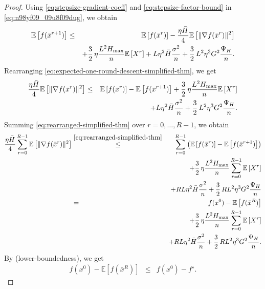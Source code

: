 \documentclass{article}
\newcommand{\Exp}[1]{{\mathbb{E}} \left[ #1 \right]}
\theoremstyle{plain}
\theoremstyle{definition}
\begin{document}
\begin{proof}
    Using \eqref{eq:stepsize-gradient-coeff} and \eqref{eq:stepsize-factor-bound} in
    \eqref{eq:n98yf09_09u8f09dug}, we obtain
    \begin{eqnarray}
    \Exp{f(\bar x^{r+1})}
    &\leq&
    \Exp{f(\bar x^r)}
    -
    \frac{\eta\bar H}{4}
    \Exp{\|\nabla f(\bar x^r)\|^2}
    \notag\\
    &&+
    \frac{3}{2}\,\eta\frac{L^2H_{\max}}{n}\Exp{X^r}
    +
    L\eta^2\bar H\frac{\sigma^2}{n}
    +
    \frac{3}{2}\,L^2\eta^3G^2\frac{\Psi_H}{n}.
    \label{eq:expected-one-round-descent-simplified-thm}
    \end{eqnarray}
    Rearranging \eqref{eq:expected-one-round-descent-simplified-thm}, we get
    \begin{eqnarray}
    \frac{\eta\bar H}{4}
    \Exp{\|\nabla f(\bar x^r)\|^2}
    &\leq&
    \Exp{f(\bar x^r)}-\Exp{f(\bar x^{r+1})}
    +
    \frac{3}{2}\,\eta\frac{L^2H_{\max}}{n}\Exp{X^r}
    \notag\\
    &&+
    L\eta^2\bar H\frac{\sigma^2}{n}
    +
    \frac{3}{2}\,L^2\eta^3G^2\frac{\Psi_H}{n}.
    \label{eq:rearranged-simplified-thm}
    \end{eqnarray}
    Summing \eqref{eq:rearranged-simplified-thm} over \(r=0,\dots,R-1\), we obtain
    \begin{eqnarray}
    \frac{\eta\bar H}{4}
    \sum_{r=0}^{R-1}\Exp{\|\nabla f(\bar x^r)\|^2}
    &\overset{\eqref{eq:rearranged-simplified-thm}}{\leq}&
    \sum_{r=0}^{R-1}
    \left(
    \Exp{f(\bar x^r)}-\Exp{f(\bar x^{r+1})}
    \right)
    \notag\\
    &&+
    \frac{3}{2}\,\eta\frac{L^2H_{\max}}{n}
    \sum_{r=0}^{R-1}\Exp{X^r}
    \notag\\
    &&+
    R L\eta^2\bar H\frac{\sigma^2}{n}
    +
    \frac{3}{2}\,R L^2\eta^3G^2\frac{\Psi_H}{n}
    \notag\\
    &=&
    f(x^0)-\Exp{f(\bar x^R)}
    \notag\\
    &&+
    \frac{3}{2}\,\eta\frac{L^2H_{\max}}{n}
    \sum_{r=0}^{R-1}\Exp{X^r}
    \notag\\
    &&+
    R L\eta^2\bar H\frac{\sigma^2}{n}
    +
    \frac{3}{2}\,R L^2\eta^3G^2\frac{\Psi_H}{n}.
    \label{eq:summed-simplified-thm}
    \end{eqnarray}
    By  (lower-boundedness), we get
    \begin{eqnarray}
    f(x^0)-\Exp{f(\bar x^R)}
    &\leq&
    f(x^0)-f^\star.
    \label{eq:lower-bound-final-iterate}
    \end{eqnarray}

\end{proof}
\end{document}
